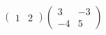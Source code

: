 \hspace*{2mm}\begin{minipage}[t]{\dimexpr\linewidth-2mm\relax}\vspace{0pt}
$\begin{pmatrix} 1 & 2 \end{pmatrix}\begin{pmatrix} 3 & -3 \\ -4 & 5 \end{pmatrix}$\end{minipage}
